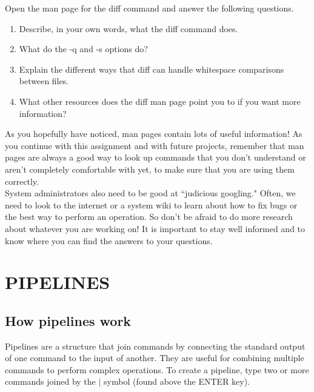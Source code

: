 \documentclass[11pt,a4paper]{article}
\begin{document}
Open the man page for the diff command and answer the following questions.

\begin{enumerate}
\item Describe, in your own words, what the diff command does.
\newline
\newline
\item What do the -q and -s options do?
\newline
\newline
\item Explain the different ways that diff can handle whitespace comparisons between files.
\newline
\newline
\item What other resources does the diff man page point you to if you want more information?
\newline
\newline
\newline
\end{enumerate}

As you hopefully have noticed, man pages contain lots of useful information! As you continue with this assignment and with future projects, remember that man pages are always a good way to look up commands that you don't understand or aren't completely comfortable with yet, to make sure that you are using them correctly.\\

System administrators also need to be good at ``judicious googling." Often, we need to look to the internet or a system wiki to learn about how to fix bugs or the best way to perform an operation. So don't be afraid to do more research about whatever you are working on! It is important to stay well informed and to know where you can find the answers to your questions.



\pagebreak

\section{PIPELINES}

\subsection*{How pipelines work}

\indent\indent Pipelines are a structure that join commands by connecting the standard output of one command to the input of another. They are useful for combining multiple commands to perform complex operations. To create a pipeline, type two or more commands joined by the $\vert$ symbol (found above the ENTER key). \\
\end{document}
